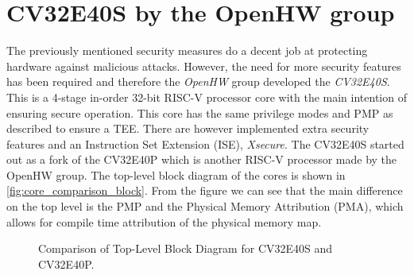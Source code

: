 \section{CV32E40S by the OpenHW group}
\label{sec:cv32}

The previously mentioned security measures do a decent job at protecting hardware against malicious attacks. However, the need for more security features has been required and therefore the \textit{OpenHW} group developed the \textit{CV32E40S}. This is a 4-stage in-order 32-bit RISC-V processor core with the main intention of ensuring secure operation\cite{cv32e40s_manual}. This core has the same privilege modes and PMP as described to ensure a TEE. There are however implemented extra security features and an Instruction Set Extension (ISE), \textit{Xsecure}. The CV32E40S started out as a fork of the CV32E40P which is another RISC-V processor made by the OpenHW group. The top-level block diagram of the cores is shown in \autoref{fig:core_comparison_block}. From the figure we can see that the main difference on the top level is the PMP and the Physical Memory Attribution (PMA), which allows for compile time attribution of the physical memory map.

\begin{figure}[h!]
\centering
    \qquad
    \caption{Comparison of Top-Level Block Diagram for CV32E40S and CV32E40P.}
    \label{fig:core_comparison_block}
\end{figure}

